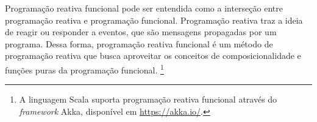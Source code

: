 Programação reativa funcional pode ser entendida 
como a interseção entre programação reativa e 
programação funcional. Programação reativa traz a 
ideia de reagir ou responder a eventos, que são 
mensagens propagadas por um programa. Dessa forma, 
programação reativa funcional é um método de 
programação reativa que busca aproveitar os 
conceitos de composicionalidade e funções puras 
da programação funcional.\cite{reactiveprog}
\footnote{A linguagem Scala suporta programação 
reativa funcional através do \textit{framework} 
Akka, disponível em \url{https://akka.io/}.}